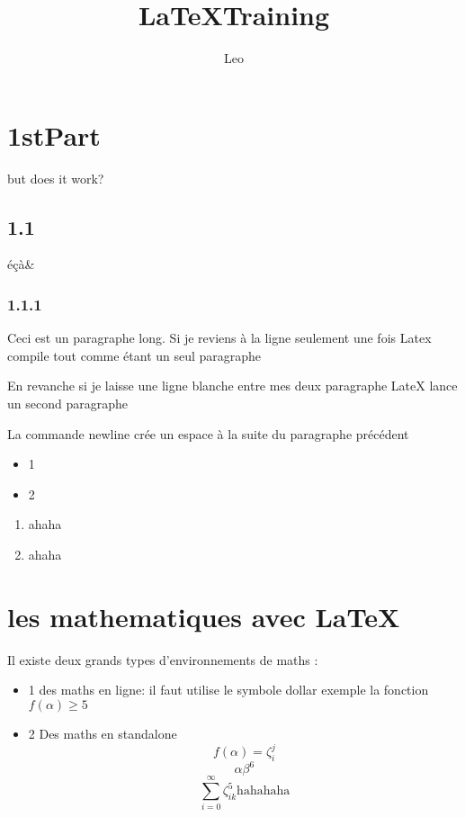 \documentclass[a4paper, 10pt]{article}
\title{\LaTeX  Training}
\author{Leo}
\begin{document}
\maketitle
\tableofcontents
\newpage
\begin{multicols}{2}

\section{1stPart}
but does it work?

\subsection{1.1}
éçà\& %
\subsubsection{1.1.1}


Ceci est un paragraphe long. 
Si je reviens à la  ligne seulement une fois Latex compile tout comme étant un seul paragraphe

En revanche si je laisse une ligne blanche entre mes deux paragraphe LateX lance un second paragraphe
\newline

La commande newline crée un espace à la suite du paragraphe précédent

\begin{itemize}
\item 1
\newline
\item 2 
\end{itemize}


\begin{enumerate}
\item ahaha
\item ahaha
\end{enumerate}


\section{les mathematiques avec \LaTeX}

Il existe deux grands types d'environnements de maths :
\begin{itemize}
\item 1
des maths en ligne:  il faut utilise le symbole dollar
exemple la fonction $f(\alpha) \geq 5$
\item 2
Des maths en standalone
$$
f(\alpha)=\zeta_i^j
$$
$$
{\alpha \beta }^6
$$
$$
\sum_{i=0}^\infty \zeta_{ik}^5
\mbox{hahahaha} %
$$


\end{itemize}
\end{multicols}
\end{document}
